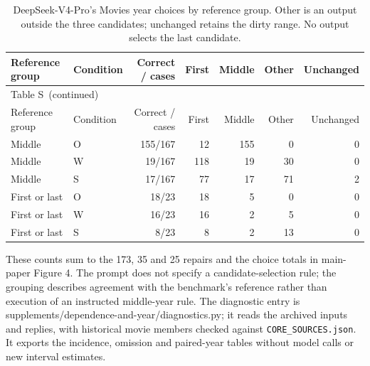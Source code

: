 \documentclass[10pt,a4paper]{article}
\renewcommand{\thetable}{S\arabic{table}}
\begin{document}
\begingroup\small\setlength{\tabcolsep}{6pt}
\begin{longtable}{@{}llrrrrr@{}}
\caption{DeepSeek-V4-Pro's Movies year choices by reference group. Other is an output outside
the three candidates; unchanged retains the dirty range. No output selects the last candidate.}
\label{report-year-reference-groups}\\
\toprule
Reference group & Condition & Correct / cases & First & Middle & Other & Unchanged \\
\midrule
\endfirsthead
\multicolumn{7}{l}{\small Table \thetable\ (continued)}\\
\toprule Reference group & Condition & Correct / cases & First & Middle & Other & Unchanged \\
\midrule\endhead
\bottomrule\endlastfoot
Middle & O & 155/167 & 12 & 155 & 0 & 0 \\
Middle & W & 19/167 & 118 & 19 & 30 & 0 \\
Middle & S & 17/167 & 77 & 17 & 71 & 2 \\
First or last & O & 18/23 & 18 & 5 & 0 & 0 \\
First or last & W & 16/23 & 16 & 2 & 5 & 0 \\
First or last & S & 8/23 & 8 & 2 & 13 & 0 \\
\end{longtable}\endgroup

These counts sum to the 173, 35 and 25 repairs and the choice totals in main-paper Figure 4.
The prompt does not specify a candidate-selection rule; the grouping describes agreement
with the benchmark's reference rather than execution of an instructed middle-year rule.
The diagnostic entry is {\ttfamily\small supplements/\allowbreak{}dependence-and-year/\allowbreak{}diagnostics.py}; it reads
the archived inputs and replies, with historical movie members checked against
\texttt{CORE\_SOURCES.json}. It exports the incidence, omission and paired-year tables without
model calls or new interval estimates.
\end{document}
